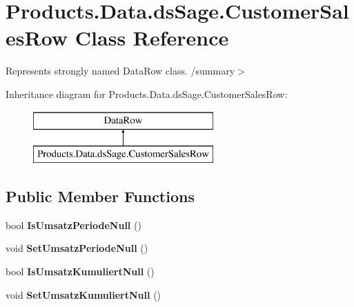 \hypertarget{class_products_1_1_data_1_1ds_sage_1_1_customer_sales_row}{}\section{Products.\+Data.\+ds\+Sage.\+Customer\+Sales\+Row Class Reference}
\label{class_products_1_1_data_1_1ds_sage_1_1_customer_sales_row}


Represents strongly named Data\+Row class. /summary$>$  


Inheritance diagram for Products.\+Data.\+ds\+Sage.\+Customer\+Sales\+Row\+:\begin{figure}[H]
\begin{center}
\leavevmode
\includegraphics[height=2.000000cm]{class_products_1_1_data_1_1ds_sage_1_1_customer_sales_row}
\end{center}
\end{figure}
\subsection*{Public Member Functions}
\begin{DoxyCompactItemize}
\item 
bool {\bfseries Is\+Umsatz\+Periode\+Null} ()\hypertarget{class_products_1_1_data_1_1ds_sage_1_1_customer_sales_row_ae88a1ada67ab338de8cdab744dee37ea}{}\label{class_products_1_1_data_1_1ds_sage_1_1_customer_sales_row_ae88a1ada67ab338de8cdab744dee37ea}

\item 
void {\bfseries Set\+Umsatz\+Periode\+Null} ()\hypertarget{class_products_1_1_data_1_1ds_sage_1_1_customer_sales_row_a39da03b4241b583aa8a074221c7a5ee4}{}\label{class_products_1_1_data_1_1ds_sage_1_1_customer_sales_row_a39da03b4241b583aa8a074221c7a5ee4}

\item 
bool {\bfseries Is\+Umsatz\+Kumuliert\+Null} ()\hypertarget{class_products_1_1_data_1_1ds_sage_1_1_customer_sales_row_ae2480705fa92d35db37bf5891ba5d768}{}\label{class_products_1_1_data_1_1ds_sage_1_1_customer_sales_row_ae2480705fa92d35db37bf5891ba5d768}

\item 
void {\bfseries Set\+Umsatz\+Kumuliert\+Null} ()\hypertarget{class_products_1_1_data_1_1ds_sage_1_1_customer_sales_row_afd3814decc0bfafb90f645b02b15103a}{}\label{class_products_1_1_data_1_1ds_sage_1_1_customer_sales_row_afd3814decc0bfafb90f645b02b15103a}

\end{DoxyCompactItemize}
